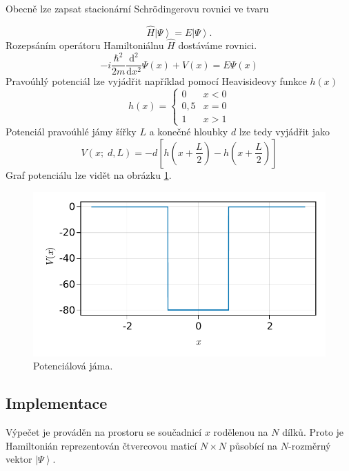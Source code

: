 \documentclass[12pt, a4paper]{article}
\newcommand{\ket}[1]{\left|#1\right>}
\begin{document}
Obecně lze zapsat stacionární Schrödingerovu rovnici ve tvaru

$$\hat{H}\ket{\Psi} = E\ket{\Psi}.$$
Rozepsáním operátoru Hamiltoniálnu $\hat{H}$ dostáváme rovnici.
$$-i\frac{\hbar^2}{2m} \frac{\mathrm{d}^2}{\mathrm{d}x^2} \Psi(x) + V(x) = E\Psi(x)$$
Pravoúhlý potenciál lze vyjádřit například pomocí Heavisideovy funkce $h(x)$
$$h(x) = \begin{cases} 0 & x < 0 \\ 0{,}5 & x = 0 \\ 1 & x>1 \end{cases}$$
Potenciál pravoúhlé jámy šířky $L$ a konečné hloubky $d$ lze tedy vyjádřit jako
$$V(x;\;d,L) = -d\left[h\left(x+\frac{L}{2}\right) - h\left(x+\frac{L}{2}\right)\right]$$
Graf potenciálu lze vidět na obrázku \ref{fig:potencial}.

\begin{figure}
    \centering
    \includegraphics{jama.pdf}
    \caption{Potenciálová jáma.}
    \label{fig:potencial}
\end{figure}

\subsection*{Implementace}

Výpečet je prováděn na prostoru se součadnicí $x$ rodělenou na ${N}$ dílků. Proto je Hamiltonián reprezentován čtvercovou maticí ${N}\times{N}$ působící na $N$-rozměrný vektor $\ket{\Psi}$.
\end{document}
